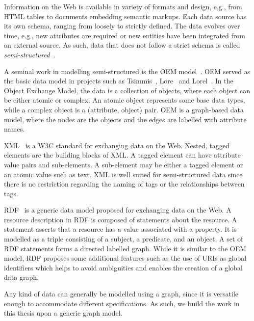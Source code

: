 Information on the Web is available in variety of formats and design, e.g., from HTML tables to documents embedding semantic markups. Each data source has its own schema, ranging from loosely to strictly defined. The data evolves over time, e.g., new attributes are required or new entities have been integrated from an external source. As such, data that does not follow a strict schema is called \emph{semi-structured}~\cite{abiteboul:1997:icdt}.


A seminal work in modelling semi-structured is the OEM model~\cite{papakonstantinou:1995:oea}. OEM served as the basic data model in projects such as Tsimmis~\cite{chawathe:1994:ipsj}, Lore~\cite{quass:1996:sigmod} and Lorel~\cite{abiteboul:97:ijdl}. In the Object Exchange Model, the data is a collection of objects, where each object can be either atomic or complex. An atomic object represents some base data types, while a complex object is a (attribute, object) pair. OEM is a graph-based data model, where the nodes are the objects and the edges are labelled with attribute names.


XML~\cite{bray:1998:xml} is a W3C standard for exchanging data on the Web. Nested, tagged elements are the building blocks of XML. A tagged element can have attribute value pairs and sub-elements. A sub-element may be either a tagged element or an atomic value such as text. XML is well suited for semi-structured data since there is no restriction regarding the naming of tags or the relationships between tags.


RDF~\cite{klyne_carroll:2004} is a generic data model proposed for exchanging data on the Web. A resource description in RDF is composed of statements about the resource. A statement asserts that a resource has a value associated with a property. It is modelled as a triple consisting of a subject, a predicate, and an object. A set of RDF statements forms a directed labelled graph. While it is similar to the OEM model, RDF proposes some additional features such as the use of URIs as global identifiers which helps to avoid ambiguities and enables the creation of a global data graph.

Any kind of data can generally be modelled using a graph, since it is versatile enough to accommodate different specifications. As such, we build the work in this thesis upon a generic graph model.


